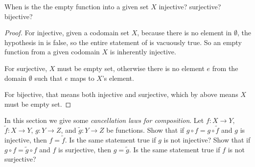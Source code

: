 \begin{exercise} \label{exercise 3.3.3}
When is the the empty function into a given set \(X\) injective? surjective? bijective?
\end{exercise}

\begin{proof}
For injective, given a codomain set \(X\), because there is no element in \(\emptyset\), the hypothesis in  is false, so the entire statement of  is vacuously true. So an empty function from a given codomain \(X\) is inherently injective.

For surjective, \(X\) must be empty set, otherwise there is no element \(e\) from the domain \(\emptyset\) such that \(e\) maps to \(X\)'s element.

For bijective, that means both injective and surjective, which by above means \(X\) must be empty set.
\end{proof}

\begin{exercise} \label{exercise 3.3.4}
In this section we give some \emph{cancellation laws for composition}. Let \(f : X \rightarrow Y\), \(\tilde{f} : X \rightarrow Y\), \(g : Y \rightarrow Z\), and \(\tilde{g} : Y \rightarrow Z\) be functions. Show that if \(g \circ f = g \circ \tilde{f}\) and \(g\) is injective, then \(f = \tilde{f}\). Is the same statement true if \(g\) is not injective? Show that if \(g \circ f = \tilde{g} \circ f\) and \(f\) is surjective, then \(g = \tilde{g}\). Is the same statement true if \(f\) is not surjective?
\end{exercise}

